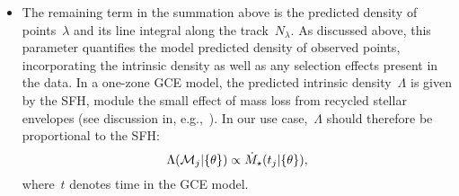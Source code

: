 \documentclass[ms.tex]{subfiles}
\begin{document}
\begin{itemize}
	\item The remaining term in the summation above is the predicted density of
	points~$\lambda$ and its line integral along the track~$N_\lambda$.
	As discussed above, this parameter quantifies the model predicted density
	of observed points, incorporating the intrinsic density as well as any
	selection effects present in the data.
	In a one-zone GCE model, the predicted intrinsic density~$\Lambda$ is given
	by the SFH, module the small effect of mass loss from recycled stellar
	envelopes (see discussion in, e.g.,~\citealp{Weinberg2017}).
	In our use case,~$\Lambda$ should therefore be proportional to the SFH:
	\begin{equation}
	\Lambda(\mathcal{M}_j | \{\theta\}) \propto \dot{M}_\star(t_j | \{\theta\}),
	\end{equation}
	where~$t$ denotes time in the GCE model.



\end{itemize}
\end{document}
